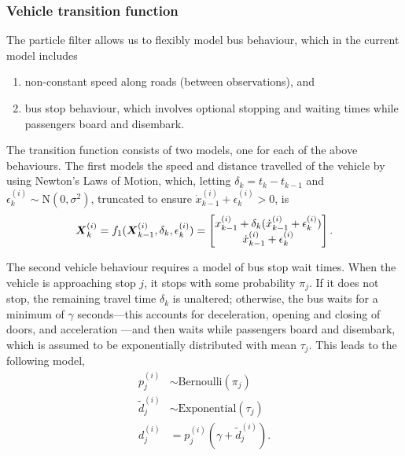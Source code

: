 \subsubsection{Vehicle transition function}
\label{sec:pf_prediction}

The particle filter allows us to flexibly model bus behaviour,
which in the current model includes
\begin{enumerate}
\item non-constant speed along roads (between observations), and
\item bus stop behaviour, which involves optional stopping and waiting times
    while passengers board and disembark.
\end{enumerate}
The transition function consists of two models,
one for each of the above behaviours.
The first models the speed and distance travelled of the vehicle 
by using Newton's Laws of Motion,
which, letting $\delta_k = t_k - t_{k-1}$ and $\epsilon_k^{(i)}\sim\mathrm{N}(0, \sigma^2)$, 
truncated to ensure $\dot x_{k-1}^{(i)} + \epsilon_k^{(i)} > 0$,
is
\begin{equation}
\label{eq:trans_newton}
\mbox{$\boldsymbol{X}$}_k^{(i)} = f_1(\mbox{$\boldsymbol{X}$}_{k-1}^{(i)}, \delta_k, \epsilon_k^{(i)}) = 
    \begin{bmatrix}
        x_{k-1}^{(i)} + \delta_k(\dot x_{k-1}^{(i)} + \epsilon_k^{(i)}) \\
        \dot x_{k-1}^{(i)} + \epsilon_k^{(i)}
    \end{bmatrix}.
\end{equation}

The second vehicle behaviour requires a model of bus stop wait times.
When the vehicle is approaching stop $j$,
it stops with some probability $\pi_j$.
If it does not stop, the remaining travel time $\delta_k$ is unaltered;
otherwise, the bus waits for a minimum of $\gamma$ seconds---this 
accounts for deceleration, opening and closing of doors, and acceleration
\citep{Hans_2015}---and then waits while passengers board and disembark,
which is assumed to be exponentially distributed with mean $\tau_j$.
This leads to the following model,
\begin{equation}
\label{eq:trans_stop}
\begin{split}
p_j^{(i)} &\sim \mathrm{Bernoulli}(\pi_j) \\
\tilde d_j^{(i)} &\sim \mathrm{Exponential}(\tau_j) \\
d_j^{(i)} &= p_j^{(i)}(\gamma + \tilde d_j^{(i)}).
\end{split}
\end{equation}

